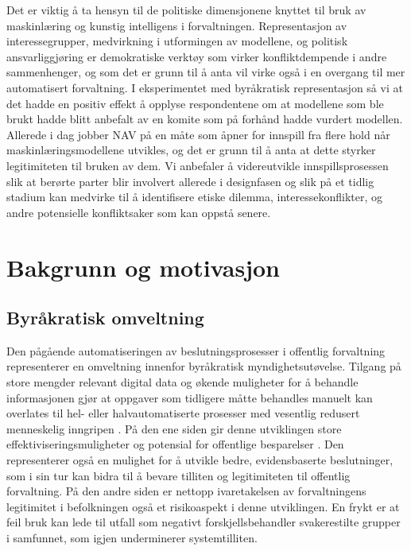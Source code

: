 \documentclass[
]{book}
\begin{document}
Det er viktig å ta hensyn til de politiske dimensjonene knyttet til bruk av maskinlæring og kunstig intelligens i forvaltningen.
Representasjon av interessegrupper, medvirkning i utformingen av modellene, og politisk ansvarliggjøring er demokratiske verktøy som virker konfliktdempende i andre sammenhenger, og som det er grunn til å anta vil virke også i en overgang til mer automatisert forvaltning.
I eksperimentet med byråkratisk representasjon så vi at det hadde en positiv effekt å opplyse respondentene om at modellene som ble brukt hadde blitt anbefalt av en komite som på forhånd hadde vurdert modellen.
Allerede i dag jobber NAV på en måte som åpner for innspill fra flere hold når maskinlæringsmodellene utvikles, og det er grunn til å anta at dette styrker legitimiteten til bruken av dem.
Vi anbefaler å videreutvikle innspillsprosessen slik at berørte parter blir involvert allerede i designfasen og slik på et tidlig stadium kan medvirke til å identifisere etiske dilemma, interessekonflikter, og andre potensielle konfliktsaker som kan oppstå senere.

\hypertarget{bakgrunn}{%
\chapter{Bakgrunn og motivasjon}\label{bakgrunn}}

\hypertarget{byruxe5kratisk-omveltning}{%
\section{Byråkratisk omveltning}\label{byruxe5kratisk-omveltning}}

Den pågående automatiseringen av beslutningsprosesser i offentlig forvaltning representerer en omveltning innenfor byråkratisk myndighetsutøvelse.
Tilgang på store mengder relevant digital data og økende muligheter for å behandle informasjonen gjør at oppgaver som tidligere måtte behandles manuelt kan overlates til hel- eller halvautomatiserte prosesser med vesentlig redusert menneskelig inngripen \citep{zarsky2016trouble}.
På den ene siden gir denne utviklingen store effektiviseringsmuligheter og potensial for offentlige besparelser \citep{duwe2017effects}.
Den representerer også en mulighet for å utvikle bedre, evidensbaserte beslutninger, som i sin tur kan bidra til å bevare tilliten og legitimiteten til offentlig forvaltning.
På den andre siden er nettopp ivaretakelsen av forvaltningens legitimitet i befolkningen også et risikoaspekt i denne utviklingen.
En frykt er at feil bruk kan lede til utfall som negativt forskjellsbehandler svakerestilte grupper i samfunnet, som igjen underminerer systemtilliten.
\end{document}
